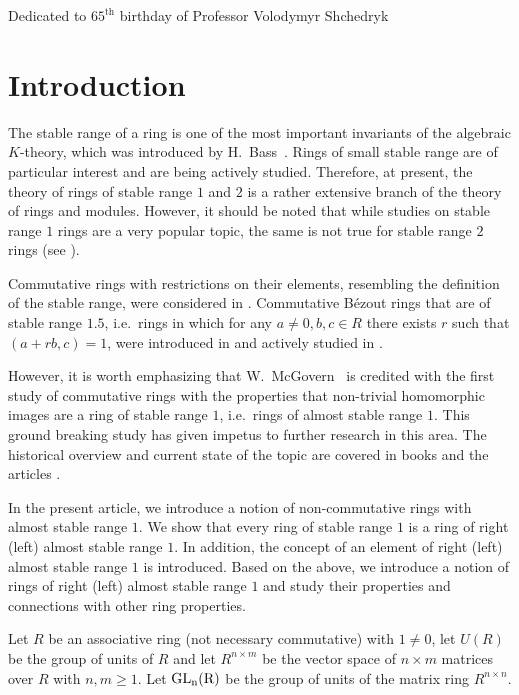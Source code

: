 \documentclass[12pt,a4paper, reqno]{amsart}
\def\GL{\rm GL}
\begin{document}
\centerline{Dedicated to $65^\text{th}$ birthday of Professor Volodymyr Shchedryk}

\section{Introduction}
The stable range  of a ring is one of the most important invariants of the algebraic $K$-theory,
which  was introduced by H.~Bass~\cite{1-bass}. Rings of small stable range  are of particular interest and are being actively studied. Therefore, at present, the theory of rings of stable range  $1$ and $2$ is a rather extensive branch of the theory of rings and modules. However, it should be noted that while studies on stable range $1$ rings are a very popular topic, the same is not true for stable range $2$ rings (see \cite[p.\,2]{3-zabavsky}).


Commutative rings with restrictions on their elements, resembling  the definition of the  stable range,  were considered in \cite{Moore_Steger}. Commutative B\'ezout rings that are of stable range  $1.5$, i.e.~rings in which for any $a\not=0, b,c\in R$ there exists $r$ such that $(a+rb,c )= 1$,  were introduced  in \cite{Shchedryk_2005} and actively studied in \cite{Bovdi_Shchedryk, Shchedryk_2017, 2-schedryk}.


However, it is worth emphasizing that W.~McGovern~\cite{4-mcGovern} is credited with the first study of commutative rings with the properties that non-trivial homomorphic images are a ring of stable range $1$, i.e.~rings of almost stable range $1$. This ground breaking study has given impetus to further research in this area.  The historical overview and current state of the topic are covered in books  \cite{Mon_Shchedryk, 12-zabavsky} and the articles \cite{Bovdi_Zabavsky, Bovdi_Shchedryk,  Gatalevich, Calugareanu,  Moore_Steger, Dopico}.



In the present  article, we introduce a notion of non-commutative rings with almost stable range $1$. We show that every ring of stable range  $1$ is a ring of right (left) almost stable range $1$. In addition, the concept of an element of right (left) almost stable range $1$ is introduced. Based on the above, we introduce  a notion of rings of right (left) almost stable range $1$ and study their properties and connections with other ring properties.



Let $R$ be an associative ring (not necessary commutative) with $1\not=0$, let $U(R)$ be the group of units of $R$  and let $R^{n\times m}$ be the vector space  of ${n\times m}$ matrices over $R$ with $n,m\geq 1$. Let $\GL_n(R)$ be the group of units of the matrix ring $R^{n\times n}$.
\end{document}
